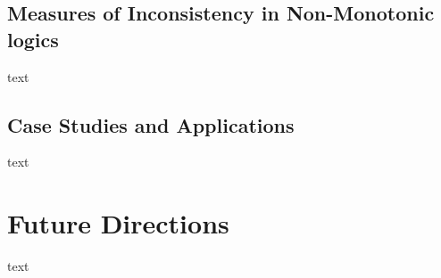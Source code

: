 \subsection{Measures of Inconsistency in Non-Monotonic logics}
text

\subsection{Case Studies and Applications}
text

\section{Future Directions}
text
